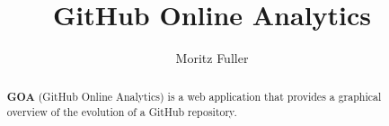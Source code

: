 \documentclass[authoryear,preprint,review,12pt]{elsarticle}
\begin{document}
\begin{frontmatter}



  \title{\textbf{G}itHub \textbf{O}nline \textbf{A}nalytics}


  \author[inst1]{Moritz Fuller}


  \begin{abstract}
    \textbf{GOA} (GitHub Online Analytics) is a web application that provides
    a graphical overview of the evolution of a GitHub repository.
  \end{abstract}




\end{frontmatter}
\end{document}
